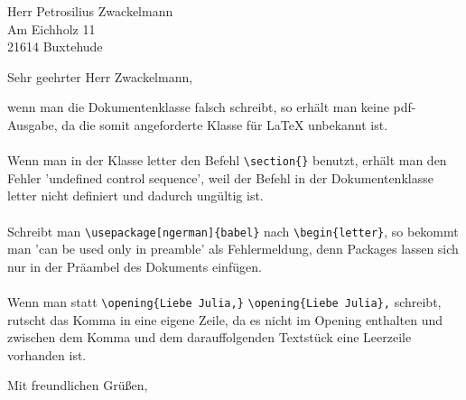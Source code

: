 \documentclass [12pt,a4paper]{letter}
\begin{document}
 

\address{Max Mustermann \\Musterstraße 45 \\ 10320 Berlin} 
\date{25. Oktober 2017} 
\signature{Max Mustermann \\ Director of Musterfirma} 

\begin{letter} 
{Herr Petrosilius Zwackelmann \\
Am Eichholz 11 \\
21614 Buxtehude } 

\opening{Sehr geehrter Herr Zwackelmann,} 

wenn man die Dokumentenklasse falsch schreibt, so erhält man keine pdf-Ausgabe, da die somit angeforderte Klasse für LaTeX unbekannt ist. \\
\\
Wenn man in der Klasse {letter} den Befehl \verb+\section{}+ benutzt, erhält man den Fehler 'undefined control sequence', weil der Befehl in der Dokumentenklasse {letter} nicht definiert und dadurch ungültig ist.\\
\\
Schreibt man \verb+\usepackage[ngerman]{babel}+ nach \verb+\begin{letter}+, so bekommt man 'can be used only in preamble' als Fehlermeldung, denn Packages lassen sich nur in der Präambel des Dokuments einfügen.\\
\\
Wenn man statt \verb+\opening{Liebe Julia,}+ \verb+\opening{Liebe Julia},+ schreibt, rutscht das Komma in eine eigene Zeile, da es nicht im Opening enthalten und zwischen dem Komma und dem darauffolgenden Textstück eine Leerzeile vorhanden ist. 

\closing{Mit freundlichen Grüßen,} 

\end{letter} 
\end{document}
